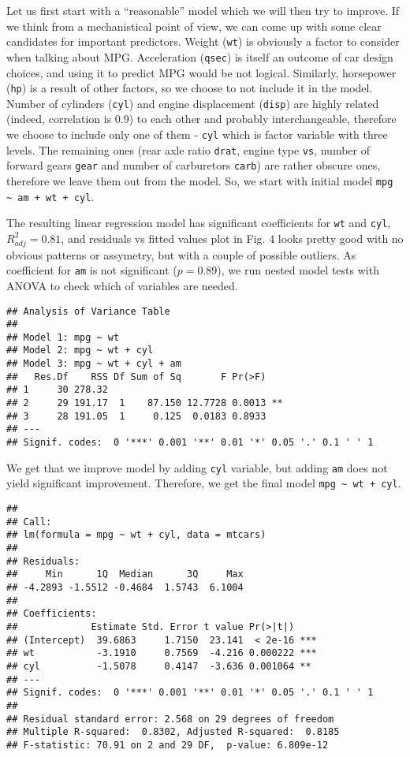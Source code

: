 \documentclass[10pt,]{article}
\begin{document}
Let us first start with a ``reasonable'' model which we will then try to
improve. If we think from a mechanistical point of view, we can come up
with some clear candidates for important predictors. Weight
(\texttt{wt}) is obviously a factor to consider when talking about MPG.
Acceleration (\texttt{qsec}) is itself an outcome of car design choices,
and using it to predict MPG would be not logical. Similarly, horsepower
(\texttt{hp}) is a result of other factors, so we choose to not include
it in the model. Number of cylinders (\texttt{cyl}) and engine
displacement (\texttt{disp}) are highly related (indeed, correlation is
0.9) to each other and probably interchangeable, therefore we choose to
include only one of them - \texttt{cyl} which is factor variable with
three levels. The remaining ones (rear axle ratio \texttt{drat}, engine
type \texttt{vs}, number of forward gears \texttt{gear} and number of
carburetors \texttt{carb}) are rather obscure ones, therefore we leave
them out from the model. So, we start with initial model
\texttt{mpg \textasciitilde{} am + wt + cyl}.

The resulting linear regression model has significant coefficients for
\texttt{wt} and \texttt{cyl}, $R^2_{adj}=0.81$, and residuals vs fitted
values plot in Fig. 4 looks pretty good with no obvious patterns or
assymetry, but with a couple of possible outliers. As coefficient for
\texttt{am} is not significant ($p=0.89$), we run nested model tests
with ANOVA to check which of variables are needed.

\begin{verbatim}
## Analysis of Variance Table
## 
## Model 1: mpg ~ wt
## Model 2: mpg ~ wt + cyl
## Model 3: mpg ~ wt + cyl + am
##   Res.Df    RSS Df Sum of Sq       F Pr(>F)   
## 1     30 278.32                               
## 2     29 191.17  1    87.150 12.7728 0.0013 **
## 3     28 191.05  1     0.125  0.0183 0.8933   
## ---
## Signif. codes:  0 '***' 0.001 '**' 0.01 '*' 0.05 '.' 0.1 ' ' 1
\end{verbatim}

We get that we improve model by adding \texttt{cyl} variable, but adding
\texttt{am} does not yield significant improvement. Therefore, we get
the final model \texttt{mpg \textasciitilde{} wt + cyl}.

\begin{verbatim}
## 
## Call:
## lm(formula = mpg ~ wt + cyl, data = mtcars)
## 
## Residuals:
##     Min      1Q  Median      3Q     Max 
## -4.2893 -1.5512 -0.4684  1.5743  6.1004 
## 
## Coefficients:
##             Estimate Std. Error t value Pr(>|t|)    
## (Intercept)  39.6863     1.7150  23.141  < 2e-16 ***
## wt           -3.1910     0.7569  -4.216 0.000222 ***
## cyl          -1.5078     0.4147  -3.636 0.001064 ** 
## ---
## Signif. codes:  0 '***' 0.001 '**' 0.01 '*' 0.05 '.' 0.1 ' ' 1
## 
## Residual standard error: 2.568 on 29 degrees of freedom
## Multiple R-squared:  0.8302, Adjusted R-squared:  0.8185 
## F-statistic: 70.91 on 2 and 29 DF,  p-value: 6.809e-12
\end{verbatim}
\end{document}
